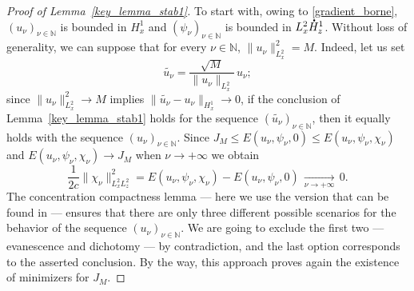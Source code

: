 \documentclass[JEP,XML,SOM,NoEqCountersInSection,NoFloatCountersInSection,Unicode,published]{cedram}
\theoremstyle{definition}
\newcommand*{\overbigdot}[1]{%
\accentset{\mbox{\large\bfseries .}}{#1}}
\newenvironment{ProofOf}[1]{\begin{proof}[Proof of #1]}{\end{proof}}
\newcommand{\N}{\mathbb{N}}
\begin{document}
\begin{ProofOf}{Lemma~\ref{key_lemma_stab1}}
To start with, owing to \eqref{gradient_borne}, $(u_{\nu})_{\nu\in\mathbb N}$ is bounded in $H_{x}^{1}$ and $(\psi_{\nu})_{\nu\in\mathbb N}$ is bounded in $L_{x}^{2}\overbigdot{H}_{z}^{1}$.
Without loss of generality, we can suppose that for every $\nu\in\N$, $\|u_{\nu}\|_{L_{x}^{2}}^{2}=M$. Indeed, let us set\vspace*{-3pt}
\[
\widetilde{u_{\nu}}=\frac{\sqrt{M}}{\|u_{\nu}\|_{L_{x}^{2}}}\,u_{\nu};
\]
since $\|u_{\nu}\|_{L_{x}^{2}}^{2}\to M$ implies $\|\widetilde{u_{\nu}}-u_{\nu}\|_{H_{x}^{1}}\to 0$, if the conclusion of Lemma~\ref{key_lemma_stab1} holds for the sequence $(\widetilde{u_{\nu}})_{\nu\in \mathbb N}$, then it equally holds with the sequence $(u_{\nu})_{\nu\in \mathbb N}$.
Since $J_{M}\leq E(u_{\nu},\psi_{\nu},0)\leq E(u_{\nu},\psi_{\nu},\chi_{\nu})$ and $E(u_{\nu},\psi_{\nu},\chi_{\nu})\to J_{M}$ when $\nu\to+\infty$ we obtain\vspace*{-3pt}
\[
\frac{1}{2c}\|\chi_{\nu}\|_{L_{x}^{2}L_{z}^{2}}^{2}=E(u_{\nu},\psi_{\nu},\chi_{\nu})-E(u_{\nu},\psi_{\nu},0)\,\underset{\nu\to +\infty}{\to}\,0.
\]
The concentration compactness lemma \cite{PLLcc1, PLLcc2} --- here we use the version that can be found in \cite[Prop.\,1.7.6]{Caze} --- ensures that there are only three different possible scenarios for the behavior of the sequence $(u_{\nu})_{\nu\in\mathbb N}$.
We are going to exclude the first two --- evanescence and dichotomy --- by contradiction, and the last option corresponds to the asserted conclusion.
By the way, this approach proves again the existence of minimizers for $J_M$.


\end{ProofOf}
\end{document}
